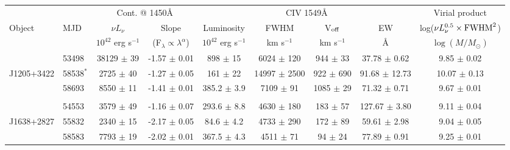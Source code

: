 \begin{table*}
  \small
  \begin{centering}
    \begin{tabular}{l  l | c c | c c c c | c}
      \hline
      \hline
              &          &  \multicolumn{2}{c}{Cont. @ 1450\AA }                  &   \multicolumn{4}{c}{CIV 1549\AA}                                                                                & Virial product \\
 Object   & MJD  &      $\nu L_{\nu}$    &         Slope                             &   Luminosity         &     FWHM                 &    V$_{\rm off}$    & EW                                 & log($\nu L_{\nu}^{0.5} \times {\rm FWHM}^2$) \\
              &         & $10^{42}$ erg s$^{-1}$ & (F$_\lambda \propto \lambda^\alpha$)  & $10^{42}$ erg s$^{-1}$ &  km s$^{-1}$   &     km s$^{-1}$   &  \AA                              &  $\log(M/M_{\odot})$ \\
      \hline
                     & 53498   &  38129  $\pm$ 39  &  -1.57 $\pm$ 0.01 &   898 $\pm$ 15    &   6024 $\pm$  120  &  944 $\pm$  33  & 37.78 $\pm$  0.62  &   9.85 $\pm$ 0.02\\
 J1205+3422 & 58538$^*$ & 2725 $\pm$ 40 &  -1.27 $\pm$ 0.05 &  161 $\pm$ 22    &  14997 $\pm$ 2500 &  922 $\pm$ 690  & 91.68 $\pm$ 12.73  &  10.07 $\pm$ 0.13\\
                     & 58693    &  8550 $\pm$ 11    &  -1.41 $\pm$ 0.01 &  385.2 $\pm$ 3.9 &   7109 $\pm$   91   & 1085 $\pm$  29  &   71.32 $\pm$  0.71  &   9.67 $\pm$ 0.01\\  
                      &              &                               &                               &                              &                                 &                             &                                   &                              \\
                      & 54553   & 3579 $\pm$ 49    &  -1.16 $\pm$ 0.07  & 293.6  $\pm$ 8.8 &  4630 $\pm$  180   & 183 $\pm$  57   & 127.67 $\pm$  3.80  &    9.11 $\pm$ 0.04\\  
 J1638+2827 & 55832   & 2340 $\pm$ 15    &  -2.17 $\pm$ 0.05  &  84.6  $\pm$ 4.2  &  4733 $\pm$  290   & 172 $\pm$  89   &  59.61 $\pm$  2.98  &    9.04 $\pm$ 0.05\\  
                      & 58583  & 7793 $\pm$ 19     &  -2.02 $\pm$ 0.01  & 367.5  $\pm$ 4.3 &  4511 $\pm$   71    &  94 $\pm$  24   &  77.89 $\pm$  0.91  &  9.25 $\pm$ 0.01\\  

\end{tabular}
\end{centering}
\end{table*}
